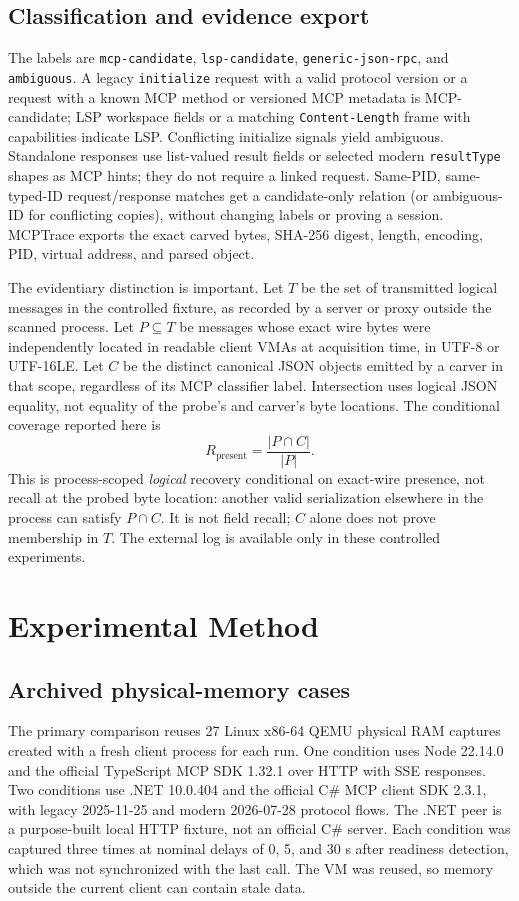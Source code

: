 \documentclass[conference,10pt]{IEEEtran}
\begin{document}
\subsection{Classification and evidence export}
The labels are \texttt{mcp-candidate}, \texttt{lsp-candidate}, \texttt{generic-json-rpc}, and \texttt{ambiguous}. A legacy \texttt{initialize} request with a valid protocol version or a request with a known MCP method or versioned MCP metadata is MCP-candidate; LSP workspace fields or a matching \texttt{Content-Length} frame with capabilities indicate LSP. Conflicting initialize signals yield ambiguous. Standalone responses use list-valued result fields or selected modern \texttt{resultType} shapes as MCP hints; they do not require a linked request. Same-PID, same-typed-ID request/response matches get a candidate-only relation (or ambiguous-ID for conflicting copies), without changing labels or proving a session. MCPTrace exports the exact carved bytes, SHA-256 digest, length, encoding, PID, virtual address, and parsed object.

The evidentiary distinction is important. Let $T$ be the set of transmitted logical messages in the controlled fixture, as recorded by a server or proxy outside the scanned process. Let $P\subseteq T$ be messages whose exact wire bytes were independently located in readable client VMAs at acquisition time, in UTF-8 or UTF-16LE. Let $C$ be the distinct canonical JSON objects emitted by a carver in that scope, regardless of its MCP classifier label. Intersection uses logical JSON equality, not equality of the probe's and carver's byte locations. The conditional coverage reported here is
\begin{equation}
R_{\mathrm{present}}=\frac{|P\cap C|}{|P|}.
\label{eq:present}
\end{equation}
This is process-scoped \emph{logical} recovery conditional on exact-wire presence, not recall at the probed byte location: another valid serialization elsewhere in the process can satisfy $P\cap C$. It is not field recall; $C$ alone does not prove membership in $T$. The external log is available only in these controlled experiments.

\section{Experimental Method}
\subsection{Archived physical-memory cases}
The primary comparison reuses 27 Linux x86-64 QEMU physical RAM captures created with a fresh client process for each run. One condition uses Node 22.14.0 and the official TypeScript MCP SDK 1.32.1 over HTTP with SSE responses. Two conditions use .NET 10.0.404 and the official C\# MCP client SDK 2.3.1, with legacy 2025-11-25 and modern 2026-07-28 protocol flows. The .NET peer is a purpose-built local HTTP fixture, not an official C\# server. Each condition was captured three times at nominal delays of 0, 5, and 30 s after readiness detection, which was not synchronized with the last call. The VM was reused, so memory outside the current client can contain stale data.
\end{document}
